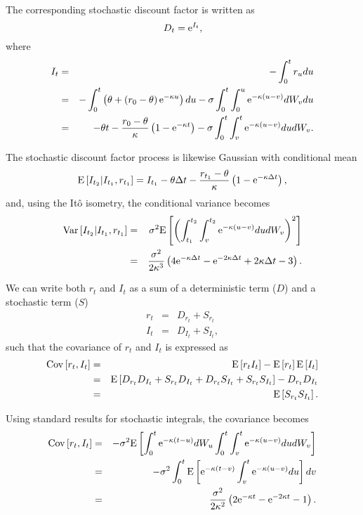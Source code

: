 The corresponding stochastic discount factor is written as
\begin{equation}
D_{t} = \text{e}^{I_t},
\end{equation}
where
\begin{eqnarray}
I_t &=& -\int_0^t r_u du \\
&=& - \int_0^t \left( \theta + \left( r_0 - \theta \right) \text{e}^{-\kappa u } \right) du - \sigma \int_0^t \int_0^u \text{e}^{-\kappa \left(u - v\right)} dW_v du \\
&=& - \theta t - \frac{r_0 - \theta}{\kappa} \left( 1 - \text{e}^{-\kappa t} \right) - \sigma \int_0^t \int_v^t \text{e}^{-\kappa \left(u - v\right)} du dW_v.
\end{eqnarray}

The stochastic discount factor process is likewise Gaussian with conditional mean
\begin{equation}
\mathrm{E} \left[ I_{t_{2}} | I_{t_1}, r_{t_1} \right] = I_{t_1} - \theta \Delta t 
- \frac{r_{t_1} - \theta}{\kappa} \left( 1 - \text{e}^{-\kappa \Delta t} \right),
\end{equation}
and, using the It\^{o} isometry, the conditional variance becomes
\begin{eqnarray}
\mathrm{Var} \left[ I_{t_{2}} | I_{t_1}, r_{t_1} \right] &=& \sigma^2 \mathrm{E} \left[ \left( \int_{t_1}^{t_2} \int_v^{t_2} \text{e}^{-\kappa \left(u - v\right)} du dW_v \right)^2 \right] \\
&=& \frac{\sigma^2}{2 \kappa^3} \left( 4 \text{e}^{-\kappa \Delta t} - \text{e}^{-2\kappa \Delta t} + 2 \kappa \Delta t - 3 \right).
\end{eqnarray}

We can write both $r_t$ and $I_t$ as a sum of a deterministic term ($D$) and a stochastic term ($S$)
\begin{eqnarray}
r_t &=& D_{r_t} + S_{r_t} \\
I_t &=& D_{I_t} + S_{I_t},
\end{eqnarray}
such that the covariance of $r_t$ and $I_t$ is expressed as
\begin{eqnarray}
\mathrm{Cov} \left[ r_t, I_t \right] &=& \mathrm{E} \left[ r_t I_t \right] - \mathrm{E} \left[ r_t \right] \mathrm{E} \left[ I_t \right] \\
&=& \mathrm{E} \left[ D_{r_t} D_{I_t} + S_{r_t} D_{I_t} + D_{r_t} S_{I_t} + S_{r_t} S_{I_t} \right] - D_{r_t} D_{I_t} \\
&=& \mathrm{E} \left[ S_{r_t} S_{I_t} \right].
\end{eqnarray}

Using standard results for stochastic integrals, the covariance becomes
\begin{eqnarray}
\mathrm{Cov} \left[ r_t, I_t \right] &=& - \sigma^2 \mathrm{E} \left[ \int_0^t \text{e}^{-\kappa (t - u)} dW_u \int_0^t \int_v^t \text{e}^{-\kappa(u-v)} du dW_v \right] \\
&=& -\sigma^2 \int_0^t \mathrm{E} \left[ \text{e}^{-\kappa(t-v)} \int_v^t \text{e}^{-\kappa(u-v)} du \right] dv \\
&=& \frac{\sigma^2}{2 \kappa^2} \left( 2 \text{e}^{-\kappa t} - \text{e}^{-2\kappa t} - 1 \right).
\end{eqnarray}

